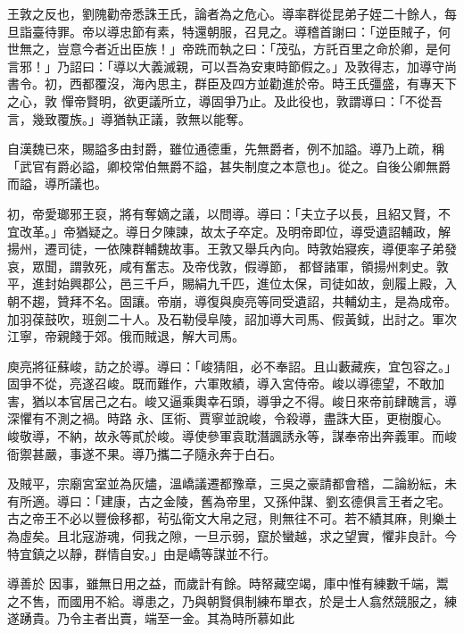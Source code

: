 \begin{pinyinscope}
 王敦之反也，劉隗勸帝悉誅王氏，論者為之危心。導率群從昆弟子姪二十餘人，每旦詣臺待罪。帝以導忠節有素，特還朝服，召見之。導稽首謝曰：「逆臣賊子，何世無之，豈意今者近出臣族！」帝跣而執之曰：「茂弘，方託百里之命於卿，是何言邪！」乃詔曰：「導以大義滅親，可以吾為安東時節假之。」及敦得志，加導守尚書令。初，西都覆沒，海內思主，群臣及四方並勸進於帝。時王氏彊盛，有專天下之心，敦
 憚帝賢明，欲更議所立，導固爭乃止。及此役也，敦謂導曰：「不從吾言，幾致覆族。」導猶執正議，敦無以能奪。



 自漢魏已來，賜謚多由封爵，雖位通德重，先無爵者，例不加謚。導乃上疏，稱「武官有爵必謚，卿校常伯無爵不謚，甚失制度之本意也」。從之。自後公卿無爵而謚，導所議也。



 初，帝愛瑯邪王裒，將有奪嫡之議，以問導。導曰：「夫立子以長，且紹又賢，不宜改革。」帝猶疑之。導日夕陳諫，故太子卒定。及明帝即位，導受遺詔輔政，解揚州，遷司徒，一依陳群輔魏故事。王敦又舉兵內向。時敦始寢疾，導便率子弟發哀，眾聞，謂敦死，咸有奮志。及帝伐敦，假導節，
 都督諸軍，領揚州刺史。敦平，進封始興郡公，邑三千戶，賜絹九千匹，進位太保，司徒如故，劍履上殿，入朝不趨，贊拜不名。固讓。帝崩，導復與庾亮等同受遺詔，共輔幼主，是為成帝。加羽葆鼓吹，班劍二十人。及石勒侵阜陵，詔加導大司馬、假黃鉞，出討之。軍次江寧，帝親餞于郊。俄而賊退，解大司馬。



 庾亮將征蘇峻，訪之於導。導曰：「峻猜阻，必不奉詔。且山藪藏疾，宜包容之。」固爭不從，亮遂召峻。既而難作，六軍敗績，導入宮侍帝。峻以導德望，不敢加害，猶以本官居己之右。峻又逼乘輿幸石頭，導爭之不得。峻日來帝前肆醜言，導深懼有不測之禍。時路
 永、匡術、賈寧並說峻，令殺導，盡誅大臣，更樹腹心。峻敬導，不納，故永等貳於峻。導使參軍袁耽潛諷誘永等，謀奉帝出奔義軍。而峻衙禦甚嚴，事遂不果。導乃攜二子隨永奔于白石。



 及賊平，宗廟宮室並為灰燼，溫嶠議遷都豫章，三吳之豪請都會稽，二論紛紜，未有所適。導曰：「建康，古之金陵，舊為帝里，又孫仲謀、劉玄德俱言王者之宅。古之帝王不必以豐儉移都，茍弘衛文大帛之冠，則無往不可。若不績其麻，則樂土為虛矣。且北寇游魂，伺我之隙，一旦示弱，竄於蠻越，求之望實，懼非良計。今特宜鎮之以靜，群情自安。」由是嶠等謀並不行。



 導善於
 因事，雖無日用之益，而歲計有餘。時帑藏空竭，庫中惟有練數千端，鬻之不售，而國用不給。導患之，乃與朝賢俱制練布單衣，於是士人翕然競服之，練遂踴貴。乃令主者出賣，端至一金。其為時所慕如此




\end{pinyinscope}

